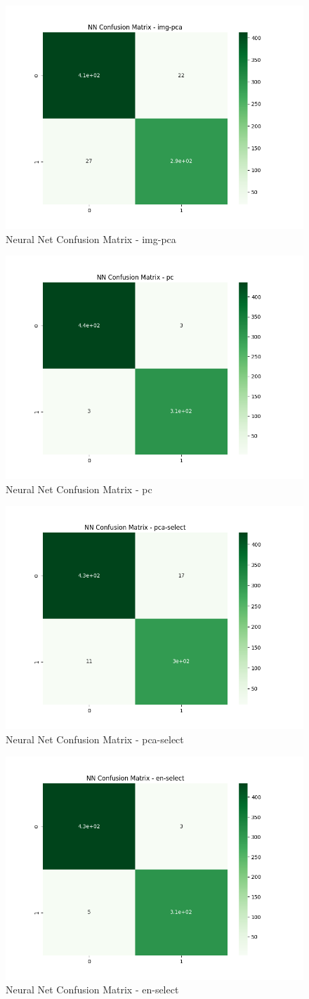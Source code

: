 \documentclass{article}
\begin{document}
\begin{multicols}{2}
\begin{figure}[H]
    \centering
    \includegraphics[width = .48\textwidth]{confusion/nn-confusion-img-pca.png}
    \caption{Neural Net Confusion Matrix - img-pca}
    \label{fig:enter-label}
\end{figure}

\begin{figure}[H]
    \centering
    \includegraphics[width = .48\textwidth]{confusion/nn-confusion-pc.png}
    \caption{Neural Net Confusion Matrix - pc}
    \label{fig:enter-label}
\end{figure}


\begin{figure}[H]
    \centering
    \includegraphics[width = .48\textwidth]{confusion/nn-confusion-pca-select.png}
    \caption{Neural Net Confusion Matrix - pca-select}
    \label{fig:enter-label}
\end{figure}

\begin{figure}[H]
    \centering
    \includegraphics[width = .48\textwidth]{confusion/nn-confusion-en-select.png}
    \caption{Neural Net Confusion Matrix - en-select}
    \label{fig:enter-label}
\end{figure}


\end{multicols}
\end{document}
